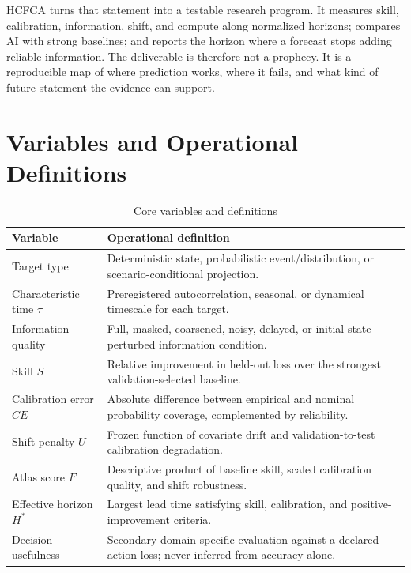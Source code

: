 \documentclass[conference]{IEEEtran}
\begin{document}
HCFCA turns that statement into a testable research program. It measures skill, calibration, information, shift, and compute along normalized horizons; compares AI with strong baselines; and reports the horizon where a forecast stops adding reliable information. The deliverable is therefore not a prophecy. It is a reproducible map of where prediction works, where it fails, and what kind of future statement the evidence can support.

\appendices
\section{Variables and Operational Definitions}
\begin{table}[t]
\caption{Core variables and definitions}
\label{tab:variables}
\centering
\begin{tabular}{p{}p{}}
\toprule
Variable & Operational definition\\
\midrule
Target type & Deterministic state, probabilistic event/distribution, or scenario-conditional projection.\\
Characteristic time $\tau$ & Preregistered autocorrelation, seasonal, or dynamical timescale for each target.\\
Information quality & Full, masked, coarsened, noisy, delayed, or initial-state-perturbed information condition.\\
Skill $S$ & Relative improvement in held-out loss over the strongest validation-selected baseline.\\
Calibration error $CE$ & Absolute difference between empirical and nominal probability coverage, complemented by reliability.\\
Shift penalty $U$ & Frozen function of covariate drift and validation-to-test calibration degradation.\\
Atlas score $F$ & Descriptive product of baseline skill, scaled calibration quality, and shift robustness.\\
Effective horizon $H^*$ & Largest lead time satisfying skill, calibration, and positive-improvement criteria.\\
Decision usefulness & Secondary domain-specific evaluation against a declared action loss; never inferred from accuracy alone.\\
\bottomrule
\end{tabular}
\end{table}
\end{document}
